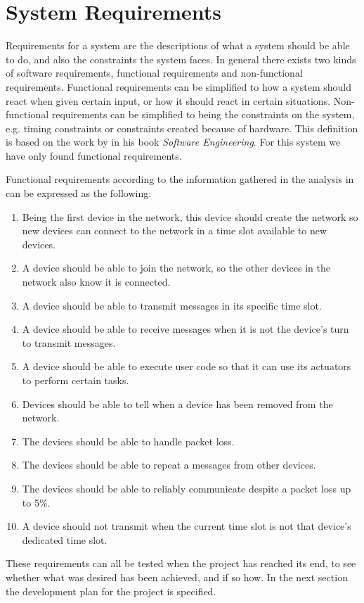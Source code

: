 \section{System Requirements}\label{requirements}
Requirements for a system are the descriptions of what a system should be able to do, and also the constraints the system faces.
In general there exists two kinds of software requirements, functional requirements and non-functional requirements. 
Functional requirements can be simplified to how a system should react when given certain input, or how it should react in certain situations.
Non-functional requirements can be simplified to being the constraints on the system, e.g. timing constraints or constraints created because of hardware.
This definition is based on the work by \citet[see][chapter 4]{SEBook} in his book \textit{Software Engineering}.
For this system we have only found functional requirements.

Functional requirements according to the information gathered in the analysis in  can be expressed as the following: 


\begin{enumerate}[label=\itshape \alph*\upshape)]
    \item Being the first device in the network, this device should create the network so new devices can connect to the network in a time slot available to new devices.
    \item A device should be able to join the network, so the other devices in the network also know it is connected.
    \item A device should be able to transmit messages in its specific time slot.
    \item A device should be able to receive messages when it is not the device's turn to transmit messages.
    \item A device should be able to execute user code so that it can use its actuators to perform certain tasks.
    \item Devices should be able to tell when a device has been removed from the network.
    \item The devices should be able to handle packet loss.
    \item The devices should be able to repeat a messages from other devices.
    \item The devices should be able to reliably communicate despite a packet loss up to 5\%.
    \item A device should not transmit when the current time slot is not that device's dedicated time slot. 
\end{enumerate}

These requirements can all be tested when the project has reached its end, to see whether what was desired has been achieved, and if so how. 
In the next section the development plan for the project is specified.